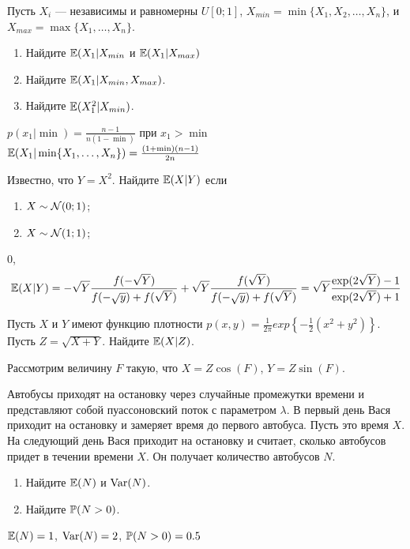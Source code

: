 \begin{problem}
	Пусть $X_{i}$ — независимы и равномерны $U[0;1]$, $X_{min} = \min \{X_1, X_2, \ldots, X_n\}$, и $X_{max} = \max\{X_1, \ldots, X_n\}$.
\begin{enumerate}
	\item Найдите $\E(X_{1}| X_{min}$ и $\E(X_{1}| X_{max})$
\item Найдите $\E(X_1 | X_{min}, X_{max})$.
\item Найдите $\E(X_1^2 | X_{min})$.
\end{enumerate}


\begin{sol}

$p(x_{1}|\min)=\frac{n-1}{n(1-\min)}$ при $x_{1}>\min$ \\
$\E(X_{1}|\min\{X_{1},\ldots,X_{n}\})=\frac{(1+\min)(n-1)}{2n}$
\end{sol}
\end{problem}

\begin{problem}
Известно, что $Y=X^2$. Найдите $\E(X|Y)$ если
\begin{enumerate}
	\item $X\sim \cN(0; 1)$;
	\item $X\sim \cN(1; 1)$;
\end{enumerate}

\begin{sol}
0, 
\[
	\E(X|Y) = -\sqrt{Y} \frac{f(-\sqrt{Y})}{f(-\sqrt{y}) + f(\sqrt{Y})} + \sqrt{Y} \frac{f(\sqrt{Y})}{f(-\sqrt{y}) + f(\sqrt{Y})} = \sqrt{Y} \frac{\exp(2\sqrt{Y}) - 1}{\exp(2\sqrt{Y})+1} 
\]
\end{sol}
\end{problem}

\begin{problem}
Пусть $X$ и $Y$ имеют функцию плотности
$p(x,y)=\frac{1}{2\pi}exp\left\{-\frac{1}{2}\left(x^{2}+y^{2}\right)\right\}$.\\
Пусть $Z=\sqrt{X+Y}$. Найдите $\E(X|Z)$.

\begin{sol}

Рассмотрим величину $F$ такую, что $X=Z\cos(F)$, $Y=Z\sin(F)$.
\end{sol}
\end{problem}

\begin{problem}
Автобусы приходят на остановку через случайные промежутки времени и представляют собой пуассоновский поток с параметром $\lambda$. В первый день Вася приходит на остановку и замеряет время до первого автобуса. Пусть это время $X$. На следующий день Вася приходит на остановку и считает, сколько автобусов придет в течении времени $X$. Он получает количество автобусов $N$.
\begin{enumerate}
\item Найдите $\E(N)$ и $\Var(N)$.
\item Найдите $\P(N>0)$.
\end{enumerate}


\begin{sol}
$\E(N)=1$, $\Var(N)=2$, $\P(N>0)=0.5$
\end{sol}
\end{problem}


